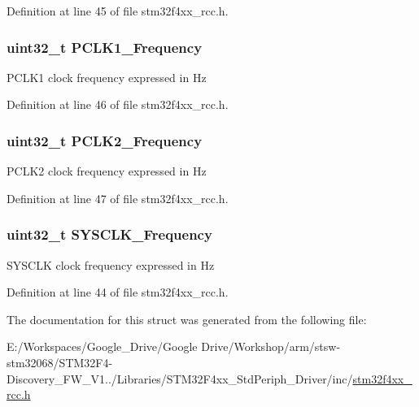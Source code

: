 Definition at line 45 of file stm32f4xx\-\_\-rcc.\-h.

\hypertarget{struct_r_c_c___clocks_type_def_a9045b24904bde572d479e85c6d2801f6}{
\subsubsection[{P\-C\-L\-K1\-\_\-\-Frequency}]{\setlength{\rightskip}{0pt plus 5cm}uint32\-\_\-t P\-C\-L\-K1\-\_\-\-Frequency}}\label{struct_r_c_c___clocks_type_def_a9045b24904bde572d479e85c6d2801f6}
P\-C\-L\-K1 clock frequency expressed in Hz 

Definition at line 46 of file stm32f4xx\-\_\-rcc.\-h.

\hypertarget{struct_r_c_c___clocks_type_def_a45ada83b2d388a60ed994451f260f389}{
\subsubsection[{P\-C\-L\-K2\-\_\-\-Frequency}]{\setlength{\rightskip}{0pt plus 5cm}uint32\-\_\-t P\-C\-L\-K2\-\_\-\-Frequency}}\label{struct_r_c_c___clocks_type_def_a45ada83b2d388a60ed994451f260f389}
P\-C\-L\-K2 clock frequency expressed in Hz 

Definition at line 47 of file stm32f4xx\-\_\-rcc.\-h.

\hypertarget{struct_r_c_c___clocks_type_def_a48b5f04759728e39921969e75c4899e8}{
\subsubsection[{S\-Y\-S\-C\-L\-K\-\_\-\-Frequency}]{\setlength{\rightskip}{0pt plus 5cm}uint32\-\_\-t S\-Y\-S\-C\-L\-K\-\_\-\-Frequency}}\label{struct_r_c_c___clocks_type_def_a48b5f04759728e39921969e75c4899e8}
S\-Y\-S\-C\-L\-K clock frequency expressed in Hz 

Definition at line 44 of file stm32f4xx\-\_\-rcc.\-h.



The documentation for this struct was generated from the following file\-:\begin{DoxyCompactItemize}
\item 
E\-:/\-Workspaces/\-Google\-\_\-\-Drive/\-Google Drive/\-Workshop/arm/stsw-\/stm32068/\-S\-T\-M32\-F4-\/\-Discovery\-\_\-\-F\-W\-\_\-\-V1../\-Libraries/\-S\-T\-M32\-F4xx\-\_\-\-Std\-Periph\-\_\-\-Driver/inc/\hyperlink{stm32f4xx__rcc_8h}{stm32f4xx\-\_\-rcc.\-h}\end{DoxyCompactItemize}
